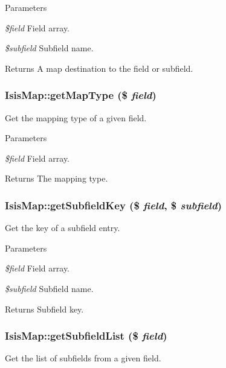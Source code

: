 \begin{DoxyParams}{Parameters}
\item[{\em \$field}]Field array.\item[{\em \$subfield}]Subfield name.\end{DoxyParams}
\begin{DoxyReturn}{Returns}
A map destination to the field or subfield. 
\end{DoxyReturn}
\hypertarget{classIsisMap_a62b933be483fb6704e12e41f10286cd5}{
\subsubsection[{getMapType}]{\setlength{\rightskip}{0pt plus 5cm}IsisMap::getMapType (\$ {\em field})}}
\label{classIsisMap_a62b933be483fb6704e12e41f10286cd5}
Get the mapping type of a given field.


\begin{DoxyParams}{Parameters}
\item[{\em \$field}]Field array.\end{DoxyParams}
\begin{DoxyReturn}{Returns}
The mapping type. 
\end{DoxyReturn}
\hypertarget{classIsisMap_ae5d904b8407b38751656715fb9efd7cf}{
\subsubsection[{getSubfieldKey}]{\setlength{\rightskip}{0pt plus 5cm}IsisMap::getSubfieldKey (\$ {\em field}, \/  \$ {\em subfield})}}
\label{classIsisMap_ae5d904b8407b38751656715fb9efd7cf}
Get the key of a subfield entry.


\begin{DoxyParams}{Parameters}
\item[{\em \$field}]Field array.\item[{\em \$subfield}]Subfield name.\end{DoxyParams}
\begin{DoxyReturn}{Returns}
Subfield key. 
\end{DoxyReturn}
\hypertarget{classIsisMap_ad0b61ec2fbfb011db4bf89c5f54efab4}{
\subsubsection[{getSubfieldList}]{\setlength{\rightskip}{0pt plus 5cm}IsisMap::getSubfieldList (\$ {\em field})}}
\label{classIsisMap_ad0b61ec2fbfb011db4bf89c5f54efab4}
Get the list of subfields from a given field.


